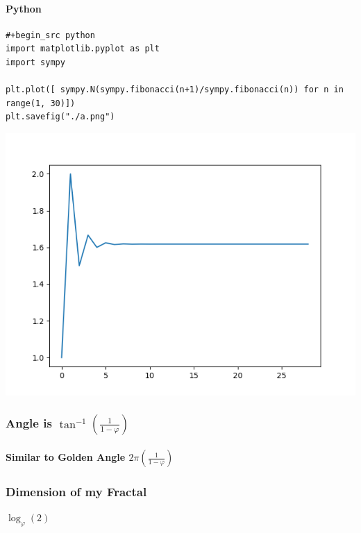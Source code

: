 \documentclass[11pt]{article}
\begin{document}
\paragraph{Python}
\label{sec:org5ec62b4}

\begin{verbatim}
#+begin_src python
import matplotlib.pyplot as plt
import sympy

plt.plot([ sympy.N(sympy.fibonacci(n+1)/sympy.fibonacci(n)) for n in range(1, 30)])
plt.savefig("./a.png")
\end{verbatim}
\begin{center}
\includegraphics[width=.9\linewidth]{./a.png}
\end{center}

\subsubsection{Angle is \(\tan^{-1}\left( \frac{1}{1-\varphi}\right)\)}
\label{sec:org2f9af08}
\paragraph{Similar to Golden Angle \(2 \pi \left( \frac{1}{1-\varphi}\right)\)}
\label{sec:org3d82fef}
\subsubsection{Dimension of my Fractal}
\label{sec:orgd3a82da}
\(\log_{\varphi}(2)\)
\end{document}
